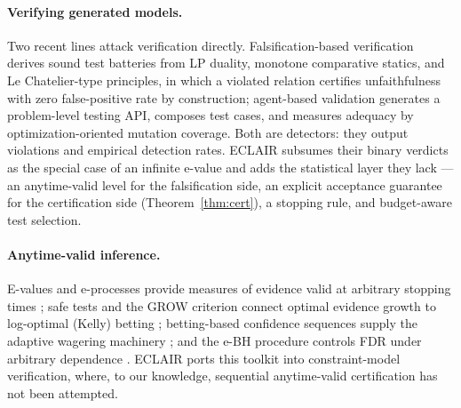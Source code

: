 \documentclass[pdflatex,sn-mathphys-num]{sn-jnl}
\theoremstyle{thmstyleone}
\theoremstyle{thmstyletwo}
\begin{document}
\paragraph{Verifying generated models.}
Two recent lines attack verification directly. Falsification-based
verification \cite{li2026falsification} derives sound test batteries
from LP duality, monotone comparative statics, and Le Chatelier-type
principles, in which a violated relation certifies unfaithfulness
with zero false-positive rate by construction; agent-based validation
\cite{zadorojniy2025agent} generates a problem-level testing API,
composes test cases, and measures adequacy by optimization-oriented
mutation coverage. Both are detectors: they output violations and
empirical detection rates. ECLAIR subsumes their binary verdicts as
the special case of an infinite e-value and adds the statistical
layer they lack --- an anytime-valid level for the falsification
side, an explicit acceptance guarantee for the certification side
(Theorem~\ref{thm:cert}), a stopping rule, and budget-aware test
selection.

\paragraph{Anytime-valid inference.}
E-values and e-processes provide measures of evidence valid at
arbitrary stopping times \cite{ramdas2023game, shafer2021testing,
vovk2021evalues}; safe tests and the GROW criterion connect optimal
evidence growth to log-optimal (Kelly) betting \cite{grunwald2024safe,
kelly1956new}; betting-based confidence sequences supply the adaptive
wagering machinery \cite{waudbysmith2024estimating}; and the e-BH
procedure controls FDR under arbitrary dependence \cite{wang2022false}.
ECLAIR ports this toolkit into constraint-model verification, where,
to our knowledge, sequential anytime-valid certification has not been
attempted.
\end{document}

